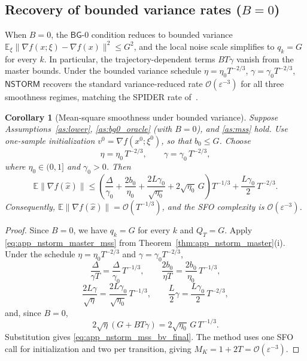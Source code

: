\documentclass[letter,11pt]{article}
\newtheorem{corollary}{Corollary}[theorem]
\newcommand{\E}{\mathbb{E}}
\newcommand{\Ocal}{\mathcal{O}}
\begin{document}

\subsection{Recovery of bounded variance rates (\texorpdfstring{$B=0$}{B=0})}
\label{app:nstorm_bv_recovery}

When $B=0$, the $\mathsf{BG}$-0 condition reduces to bounded variance
$\E_\xi\|\nabla f(x;\xi)-\nabla f(x)\|^2\le G^2$, and the local noise
scale simplifies to $q_k=G$ for every $k$. In particular, the
trajectory-dependent terms $BT\gamma$ vanish from the master bounds.
Under the bounded variance schedule
$\eta=\eta_0 T^{-2/3}$, $\gamma=\gamma_0 T^{-2/3}$, $\mathsf{NSTORM}$
recovers the standard variance-reduced rate $\Ocal(\varepsilon^{-3})$ for
all three smoothness regimes, matching the SPIDER rate
of~\citet{fang2018spider,chen2023generalized}.

\begin{corollary}[Mean-square smoothness under bounded variance]
\label{cor:app_nstorm_mss_bv}
Suppose Assumptions~\ref{as:lower}, \ref{as:bg0_oracle} (with $B=0$), and
\ref{as:mss} hold. Use one-sample initialization $v^0=\nabla f(x^0;\xi^0)$,
so that $b_0\le G$. Choose
\[
    \eta = \eta_0\,T^{-2/3},
    \qquad
    \gamma = \gamma_0\,T^{-2/3},
\]
where $\eta_0\in(0,1]$ and $\gamma_0>0$. Then
\begin{equation}
\label{eq:app_nstorm_mss_bv_final}
    \E\|\nabla f(\widehat x)\|
    \le
    \left(
        \frac{\Delta}{\gamma_0}
        + \frac{2b_0}{\eta_0}
        + \frac{2L\gamma_0}{\sqrt{\eta_0}}
        + 2\sqrt{\eta_0}\,G
    \right) T^{-1/3}
    + \frac{L\gamma_0}{2}\,T^{-2/3}.
\end{equation}
Consequently,
$\E\|\nabla f(\widehat x)\| = \Ocal(T^{-1/3})$,
and the SFO complexity is $\Ocal(\varepsilon^{-3})$.
\end{corollary}

\begin{proof}
Since $B=0$, we have $q_k=G$ for every $k$ and $Q_T=G$. Apply
\eqref{eq:app_nstorm_master_mss} from Theorem~\ref{thm:app_nstorm_master}(i).
Under the schedule $\eta=\eta_0 T^{-2/3}$ and $\gamma=\gamma_0 T^{-2/3}$,
\[
    \frac{\Delta}{\gamma T}
    = \frac{\Delta}{\gamma_0}\,T^{-1/3},
    \qquad
    \frac{2b_0}{\eta T}
    = \frac{2b_0}{\eta_0}\,T^{-1/3},
\]
\[
    \frac{2L\gamma}{\sqrt{\eta}}
    = \frac{2L\gamma_0}{\sqrt{\eta_0}}\,T^{-1/3},
    \qquad
    \frac{L}{2}\gamma
    = \frac{L\gamma_0}{2}\,T^{-2/3},
\]
and, since $B=0$,
\[
    2\sqrt{\eta}(G+BT\gamma)
    = 2\sqrt{\eta_0}\,G\,T^{-1/3}.
\]
Substitution gives \eqref{eq:app_nstorm_mss_bv_final}. The method uses one
SFO call for initialization and two per transition, giving
$M_K=1+2T=\Ocal(\varepsilon^{-3})$.
\end{proof}
\end{document}

